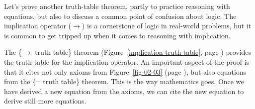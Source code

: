 Let's prove another truth-table theorem, partly to practice
reasoning with equations, but also to discuss a common
point of confusion about logic. The implication operator
($\rightarrow$) is a cornerstone of logic in real-world problems,
but it is common to get tripped up when it comes to
reasoning with implication.

The \{$\rightarrow$ truth table\} theorem
(Figure~\ref{implication-truth-table}, page \pageref{implication-truth-table})
provides the truth table
for the implication operator.
An important aspect of the proof is that it cites
not only axioms from Figure~\ref{fig-02-03} (page \pageref{fig-02-03}),
but also equations from the \{$\neg$ truth table\} theorem.
This is the way mathematics goes. Once we have derived
a new equation from the axioms, we can cite
the new equation to derive still more equations.

